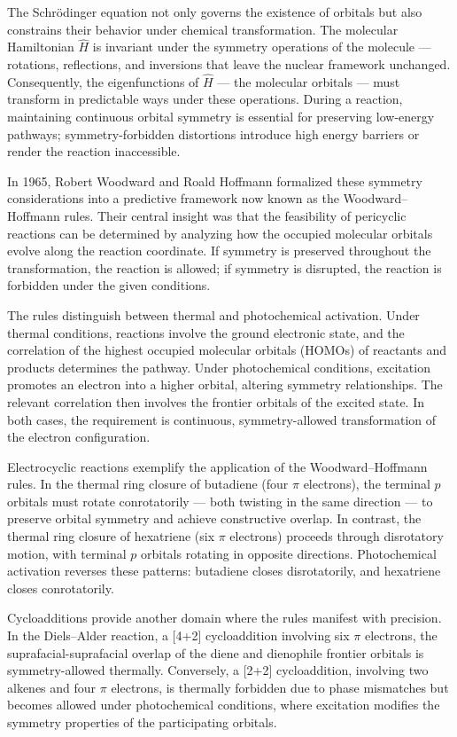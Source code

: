 The Schrödinger equation not only governs the existence of orbitals but also constrains their behavior under chemical transformation. The molecular Hamiltonian $\hat{H}$ is invariant under the symmetry operations of the molecule — rotations, reflections, and inversions that leave the nuclear framework unchanged. Consequently, the eigenfunctions of $\hat{H}$ — the molecular orbitals — must transform in predictable ways under these operations. During a reaction, maintaining continuous orbital symmetry is essential for preserving low-energy pathways; symmetry-forbidden distortions introduce high energy barriers or render the reaction inaccessible.

In 1965, Robert Woodward and Roald Hoffmann formalized these symmetry considerations into a predictive framework now known as the Woodward–Hoffmann rules. Their central insight was that the feasibility of pericyclic reactions can be determined by analyzing how the occupied molecular orbitals evolve along the reaction coordinate. If symmetry is preserved throughout the transformation, the reaction is allowed; if symmetry is disrupted, the reaction is forbidden under the given conditions.

The rules distinguish between thermal and photochemical activation. Under thermal conditions, reactions involve the ground electronic state, and the correlation of the highest occupied molecular orbitals (HOMOs) of reactants and products determines the pathway. Under photochemical conditions, excitation promotes an electron into a higher orbital, altering symmetry relationships. The relevant correlation then involves the frontier orbitals of the excited state. In both cases, the requirement is continuous, symmetry-allowed transformation of the electron configuration.

Electrocyclic reactions exemplify the application of the Woodward–Hoffmann rules. In the thermal ring closure of butadiene (four $\pi$ electrons), the terminal $p$ orbitals must rotate conrotatorily — both twisting in the same direction — to preserve orbital symmetry and achieve constructive overlap. In contrast, the thermal ring closure of hexatriene (six $\pi$ electrons) proceeds through disrotatory motion, with terminal $p$ orbitals rotating in opposite directions. Photochemical activation reverses these patterns: butadiene closes disrotatorily, and hexatriene closes conrotatorily.

Cycloadditions provide another domain where the rules manifest with precision. In the Diels–Alder reaction, a [4+2] cycloaddition involving six $\pi$ electrons, the suprafacial-suprafacial overlap of the diene and dienophile frontier orbitals is symmetry-allowed thermally. Conversely, a [2+2] cycloaddition, involving two alkenes and four $\pi$ electrons, is thermally forbidden due to phase mismatches but becomes allowed under photochemical conditions, where excitation modifies the symmetry properties of the participating orbitals.

